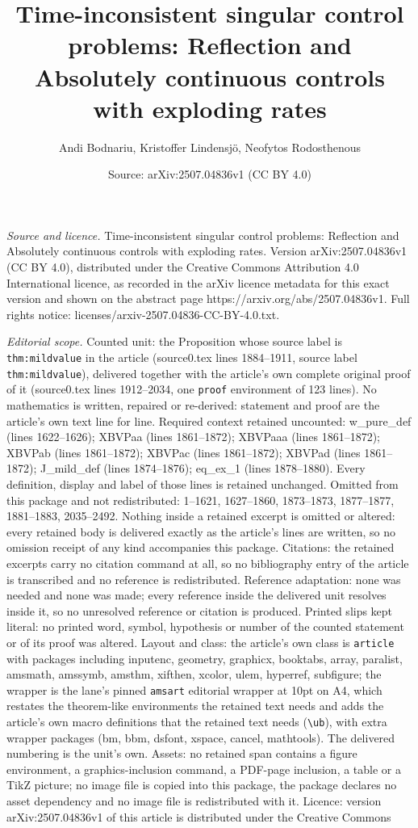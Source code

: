 \documentclass[10pt,a4paper]{amsart}
\title[Time-inconsistent singular control problems: Reflection and ]{Time-inconsistent singular control problems: Reflection and Absolutely continuous controls with exploding rates}
\author{Andi Bodnariu, Kristoffer Lindensj\"o, Neofytos Rodosthenous}
\date{Source: arXiv:2507.04836v1 (CC BY 4.0)}
\begin{document}
\maketitle

\noindent\emph{Source and licence.} Time-inconsistent singular control problems: Reflection and Absolutely continuous controls with exploding rates. Version arXiv:2507.04836v1 (CC BY 4.0), distributed under the Creative Commons Attribution 4.0 International licence, as recorded in the arXiv licence metadata for this exact version and shown on the abstract page https://arxiv.org/abs/2507.04836v1. Full rights notice: licenses/arxiv-2507.04836-CC-BY-4.0.txt.\par\smallskip

\noindent\textit{Editorial scope.} Counted unit: the Proposition whose source label is \texttt{thm:mildvalue} in the article (source0.tex lines 1884--1911, source label \texttt{thm:mildvalue}), delivered together with the article's own complete original proof of it (source0.tex lines 1912--2034, one \texttt{proof} environment of 123 lines). No mathematics is written, repaired or re-derived: statement and proof are the article's own text line for line. Required context retained uncounted: w\_pure\_def (lines 1622--1626); XBVPaa (lines 1861--1872); XBVPaaa (lines 1861--1872); XBVPab (lines 1861--1872); XBVPac (lines 1861--1872); XBVPad (lines 1861--1872); J\_mild\_def (lines 1874--1876); eq\_ex\_1 (lines 1878--1880). Every definition, display and label of those lines is retained unchanged. Omitted from this package and not redistributed: 1--1621, 1627--1860, 1873--1873, 1877--1877, 1881--1883, 2035--2492. Nothing inside a retained excerpt is omitted or altered: every retained body is delivered exactly as the article's lines are written, so no omission receipt of any kind accompanies this package. Citations: the retained excerpts carry no citation command at all, so no bibliography entry of the article is transcribed and no reference is redistributed. Reference adaptation: none was needed and none was made; every reference inside the delivered unit resolves inside it, so no unresolved reference or citation is produced. Printed slips kept literal: no printed word, symbol, hypothesis or number of the counted statement or of its proof was altered. Layout and class: the article's own class is \texttt{article} with packages including inputenc, geometry, graphicx, booktabs, array, paralist, amsmath, amssymb, amsthm, xifthen, xcolor, ulem, hyperref, subfigure; the wrapper is the lane's pinned \texttt{amsart} editorial wrapper at 10pt on A4, which restates the theorem-like environments the retained text needs and adds the article's own macro definitions that the retained text needs (\texttt{\textbackslash ub}), with extra wrapper packages (bm, bbm, dsfont, xspace, cancel, mathtools). The delivered numbering is the unit's own. Assets: no retained span contains a figure environment, a graphics-inclusion command, a PDF-page inclusion, a table or a TikZ picture; no image file is copied into this package, the package declares no asset dependency and no image file is redistributed with it. Licence: version arXiv:2507.04836v1 of this article is distributed under the Creative Commons 
\end{document}
